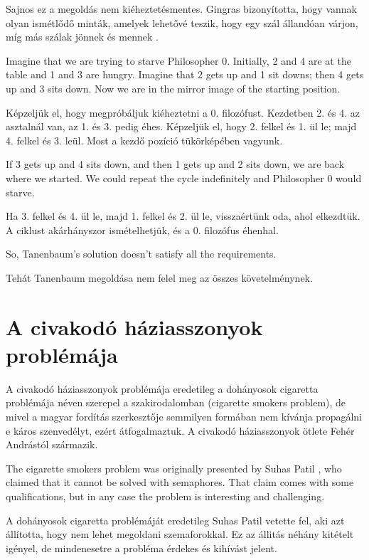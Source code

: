 \documentclass{book}
\newcommand{\clearemptydoublepage}{\newpage\cleardoublepage}
\begin{document}
Sajnos ez a megoldás nem kiéheztetésmentes. Gingras bizonyította, hogy vannak
olyan ismétlődő minták, amelyek lehetővé teszik, hogy egy szál állandóan
várjon, míg más szálak jönnek és mennek \cite{gingras90dining}.

Imagine that we are trying to starve Philosopher 0.  Initially,
2 and 4 are at the table and 1 and 3 are hungry.  Imagine that 2 gets up and
1 sit downs; then 4 gets up and 3 sits down.
Now we are in the mirror image of the starting position.

Képzeljük el, hogy megpróbáljuk kiéheztetni a 0. filozófust.
Kezdetben 2. és 4. az asztalnál van, az 1. és 3. pedig éhes.
Képzeljük el, hogy 2. felkel és 1. ül le; majd 4. felkel és 3. leül.
Most a kezdő pozíció tükörképében vagyunk.

If 3 gets up and 4 sits
down, and then 1 gets up and 2 sits down, we are back
where we started.  We could repeat the cycle indefinitely and
Philosopher 0 would starve.

Ha 3. felkel és 4. ül le, majd 1. felkel és 2. ül le, visszaértünk oda,
ahol elkezdtük. A ciklust akárhányszor ismételhetjük, és a 0. filozófus éhenhal.

So, Tanenbaum's solution doesn't satisfy all the requirements.

Tehát Tanenbaum megoldása nem felel meg az összes követelménynek.


\clearemptydoublepage
\section{A civakodó háziasszonyok problémája}

A civakodó háziasszonyok problémája eredetileg a dohányosok
cigaretta problémája néven szerepel a szakirodalomban (cigarette smokers problem),
de mivel a magyar fordítás szerkesztője semmilyen formában
nem kívánja propagálni e káros szenvedélyt, ezért átfogalmaztuk.
A civakodó háziasszonyok ötlete Fehér Andrástól származik.

The cigarette smokers problem was originally presented by
Suhas Patil \cite{patil}, who claimed that it cannot be solved with
semaphores.  That claim comes with some qualifications, but in
any case the problem is interesting and challenging.

A dohányosok cigaretta problémáját eredetileg Suhas Patil vetette fel\cite{patil},
aki azt állította, hogy nem lehet megoldani
szemaforokkal. Ez az állitás néhány kitételt igényel, de mindenesetre
a probléma érdekes és kihívást jelent.
\end{document}
